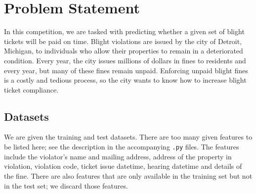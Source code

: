 \documentclass[12pt,letterpaper]{article}
\numberwithin{equation}{section}
\begin{document}





\section{Problem Statement}
In this competition, we are tasked with predicting whether a given set of blight tickets will be paid on time. Blight violations are issued by the city of Detroit, Michigan, to individuals who allow their properties to remain in a deteriorated condition. Every year, the city issues millions of dollars in fines to residents and every year, but many of these fines remain unpaid. Enforcing unpaid blight fines is a costly and tedious process, so the city wants to know how to increase blight ticket compliance.

\subsection{Datasets}
We are given the training and test datasets. There are too many given features to be listed here; see the description in the accompanying \verb|.py| files. The features include the violator's name and mailing address, address of the property in violation, violation code, ticket issue datetime, hearing datetime and details of the fine. There are also features that are only available in the training set but not in the test set; we discard those features.
\end{document}
